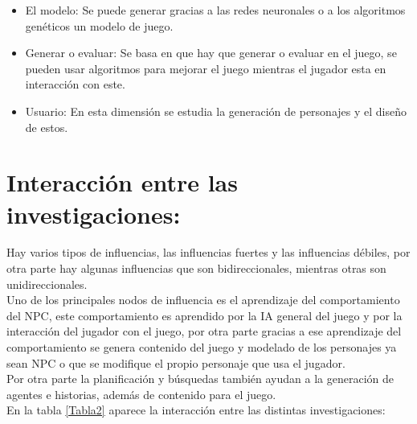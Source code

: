 \begin{itemize}

	\item El modelo: Se puede generar gracias a las redes neuronales o a los algoritmos 	genéticos un modelo de juego.\\
		
	\item Generar o evaluar: Se basa en que hay que generar o evaluar en el juego, se pueden 	usar algoritmos para mejorar el juego mientras el jugador esta en interacción con este.\\

	\item Usuario: En esta dimensión se estudia la generación de personajes y el diseño de 	estos.\\  
	
\end{itemize}

\section{Interacción entre las investigaciones:}

Hay varios tipos de influencias, las influencias fuertes y las influencias débiles, por otra parte hay algunas influencias que son bidireccionales, mientras otras son unidireccionales.\\

Uno de los principales nodos de influencia es el aprendizaje del comportamiento del NPC, este comportamiento es aprendido por la IA general del juego y por la interacción del jugador con el juego, por otra parte gracias a ese aprendizaje del comportamiento se genera contenido del juego y modelado de los personajes ya sean NPC o que se modifique el propio personaje que usa el jugador.\\

Por otra parte la planificación y búsquedas también ayudan a la generación de agentes e historias, además de contenido para el juego.\\

En la tabla \ref{Tabla2} aparece la interacción entre las distintas investigaciones:\\


